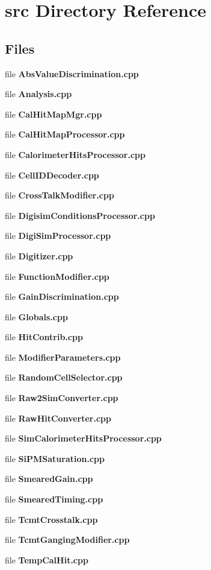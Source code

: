 \section{src Directory Reference}
\label{dir_34b3aa13beb72b96b534e11245073a99}
\subsection*{Files}
\begin{DoxyCompactItemize}
\item 
file {\bfseries Abs\-Value\-Discrimination.\-cpp}
\item 
file {\bfseries Analysis.\-cpp}
\item 
file {\bfseries Cal\-Hit\-Map\-Mgr.\-cpp}
\item 
file {\bfseries Cal\-Hit\-Map\-Processor.\-cpp}
\item 
file {\bfseries Calorimeter\-Hits\-Processor.\-cpp}
\item 
file {\bfseries Cell\-I\-D\-Decoder.\-cpp}
\item 
file {\bfseries Cross\-Talk\-Modifier.\-cpp}
\item 
file {\bfseries Digisim\-Conditions\-Processor.\-cpp}
\item 
file {\bfseries Digi\-Sim\-Processor.\-cpp}
\item 
file {\bfseries Digitizer.\-cpp}
\item 
file {\bfseries Function\-Modifier.\-cpp}
\item 
file {\bfseries Gain\-Discrimination.\-cpp}
\item 
file {\bfseries Globals.\-cpp}
\item 
file {\bfseries Hit\-Contrib.\-cpp}
\item 
file {\bfseries Modifier\-Parameters.\-cpp}
\item 
file {\bfseries Random\-Cell\-Selector.\-cpp}
\item 
file {\bfseries Raw2\-Sim\-Converter.\-cpp}
\item 
file {\bfseries Raw\-Hit\-Converter.\-cpp}
\item 
file {\bfseries Sim\-Calorimeter\-Hits\-Processor.\-cpp}
\item 
file {\bfseries Si\-P\-M\-Saturation.\-cpp}
\item 
file {\bfseries Smeared\-Gain.\-cpp}
\item 
file {\bfseries Smeared\-Timing.\-cpp}
\item 
file {\bfseries Tcmt\-Crosstalk.\-cpp}
\item 
file {\bfseries Tcmt\-Ganging\-Modifier.\-cpp}
\item 
file {\bfseries Temp\-Cal\-Hit.\-cpp}
\end{DoxyCompactItemize}
